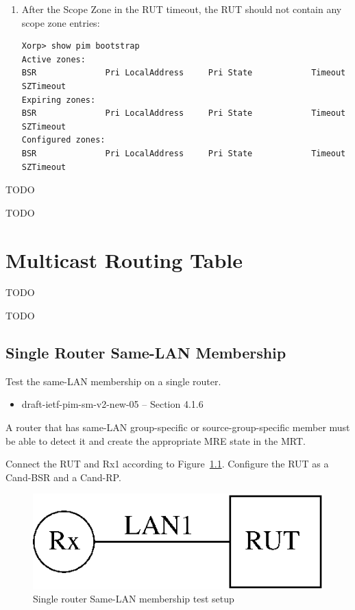 \documentclass[11pt]{report}
\begin{document}
\begin{enumerate}
  \item After the Scope Zone in the RUT timeout, the RUT should not contain any
        scope zone entries:

\begin{verbatim}
Xorp> show pim bootstrap
Active zones:
BSR              Pri LocalAddress     Pri State            Timeout SZTimeout
Expiring zones:
BSR              Pri LocalAddress     Pri State            Timeout SZTimeout
Configured zones:
BSR              Pri LocalAddress     Pri State            Timeout SZTimeout
\end{verbatim}

\end{enumerate}


TODO

TODO

\chapter{Multicast Routing Table}

TODO

TODO

\newpage
\section{Single Router Same-LAN Membership}

Test the same-LAN membership on a single router.

\begin{itemize}
  \item draft-ietf-pim-sm-v2-new-05 -- Section 4.1.6
\end{itemize}

A router that has same-LAN group-specific or
source-group-specific member must be able to detect it and create the
appropriate MRE state in the MRT.

Connect the RUT and Rx1 according to
Figure~\ref{fig:single_router_same_lan_membership}.
Configure the RUT as a Cand-BSR and a Cand-RP.

\begin{figure}[htbp]
  \begin{center}
    \includegraphics[scale=0.8]{figs/pim_test_7_1_single_router_samelan_membership}
    \caption{Single router Same-LAN membership test setup}
    \label{fig:single_router_same_lan_membership}
  \end{center}
\end{figure}
\end{document}
